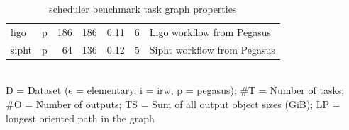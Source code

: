 \begin{table}[h]
\begin{tabular}{l|lrrrr|T}
		ligo             & p & 186 & 186   & 0.11   & 6   & Ligo workflow from
		Pegasus                                                                                    \\
		sipht            & p & 64  & 136   & 0.12   & 5   & Sipht workflow from
		Pegasus                                                                                    \\
		\bottomrule
	\end{tabular}\\
	\vspace{2mm}
	D = Dataset (e = elementary, i = irw, p = pegasus); \#T = Number of tasks; \#O = Number of outputs;
	TS = Sum of all output object sizes (GiB); LP = longest oriented path in the graph

	\caption{\estee{} scheduler benchmark task graph properties}
	\label{tab:estee-graph-properties}
\end{table}

